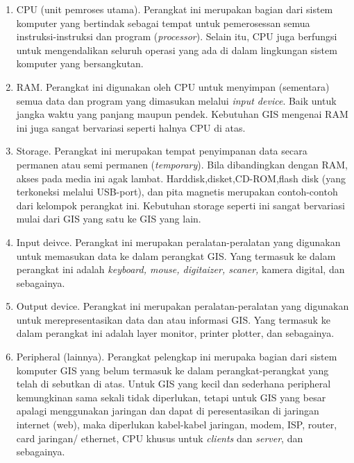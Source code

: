 \begin{enumerate}
\item CPU (unit pemroses utama). Perangkat ini merupakan bagian dari sistem komputer yang bertindak sebagai tempat untuk pemerosessan semua instruksi-instruksi dan program (\textit{processor}). Selain itu, CPU juga berfungsi untuk mengendalikan seluruh operasi yang ada di dalam lingkungan sistem komputer yang bersangkutan.

\item RAM. Perangkat ini digunakan oleh CPU untuk menyimpan (sementara) semua data dan program yang dimasukan melalui \textit{input device}. Baik untuk jangka waktu yang panjang maupun pendek. Kebutuhan GIS mengenai RAM ini juga sangat bervariasi seperti halnya CPU di atas. 

\item Storage. Perangkat ini merupakan tempat penyimpanan data secara permanen atau semi permanen (\textit{temporary}). Bila dibandingkan dengan RAM, akses pada media ini agak lambat. Harddisk,disket,CD-ROM,flash disk (yang terkoneksi melalui USB-port), dan pita magnetis merupakan contoh-contoh dari kelompok perangkat ini. Kebutuhan storage seperti ini sangat bervariasi mulai dari GIS yang satu ke GIS yang lain.

\item Input deivce. Perangkat ini merupakan peralatan-peralatan yang digunakan untuk memasukan data ke dalam perangkat GIS. Yang termasuk ke dalam perangkat ini adalah \textit{keyboard, mouse, digitaizer, scaner,} kamera digital, dan sebagainya.

\item Output device. Perangkat ini merupakan peralatan-peralatan yang digunakan untuk merepresentasikan data dan atau informasi GIS. Yang termasuk ke dalam perangkat ini adalah layer monitor, printer plotter, dan sebagainya.

\item Peripheral (lainnya). Perangkat pelengkap ini merupaka bagian dari sistem komputer GIS yang belum termasuk ke dalam perangkat-perangkat yang telah di sebutkan di atas. Untuk GIS yang kecil dan sederhana peripheral kemungkinan sama sekali tidak diperlukan, tetapi untuk GIS yang besar apalagi menggunakan jaringan dan dapat di peresentasikan di jaringan internet (web), maka diperlukan kabel-kabel jaringan, modem, ISP, router, card jaringan/ ethernet, CPU khusus untuk \textit{clients} dan \textit{server}, dan sebagainya.
\end{enumerate}



